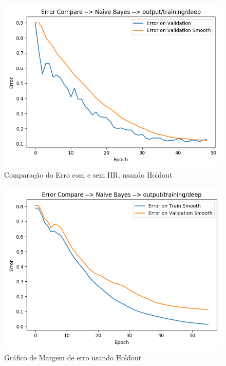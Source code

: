 \documentclass[
article,			%
11pt,				%
oneside,			%
a4paper,			%
english,			%
brazil,				%
sumario=tradicional,
]{abntex2}
\begin{document}
	\begin{anexosenv}
		
		\begin{figure}[htb]
			\caption{\label{fig_smooth_example} Comparação do Erro com e sem IIR, usando Holdout}
			\begin{center}
				\includegraphics[scale=0.5]{smooth_compare.png}
			\end{center}
		\end{figure}
		
		\begin{figure}[htb]
			\caption{\label{error-naive-bayes-holdout}Gráfico de Margem de erro usando Holdout}
			\begin{center}
				\includegraphics[scale=0.5]{error-naive-bayes-holdout.png}
			\end{center}
		\end{figure}


\end{anexosenv}
\end{document}
